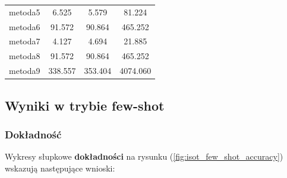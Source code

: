 \begin{table}[H]
\begin{tabular}{lccc}
		metoda5           & 6.525         & 5.579            & 81.224         \\
		metoda6           & 91.572        & 90.864           & 465.252        \\
		metoda7           & 4.127         & 4.694            & 21.885         \\
		metoda8           & 91.572        & 90.864           & 465.252        \\
		metoda9           & 338.557       & 353.404          & 4074.060       \\
		\bottomrule
	\end{tabular}
\end{table}

\subsection{Wyniki w trybie few-shot}
\subsubsection{Dokładność}
Wykresy słupkowe \textbf{dokładności} na rysunku (\ref{fig:isot_few_shot_accuracy}) wskazują następujące wnioski:

